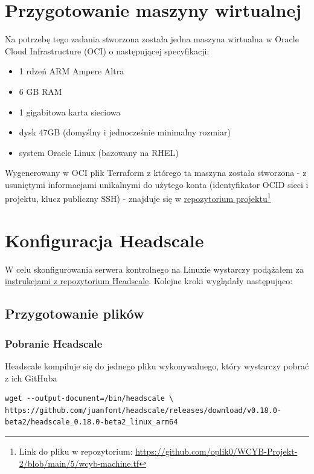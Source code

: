 \documentclass[../main.tex]{subfiles}
\begin{document}
\section{Przygotowanie maszyny wirtualnej}
Na potrzebę tego zadania stworzona została jedna maszyna wirtualna w Oracle Cloud Infrastructure (OCI) o następującej specyfikacji:
\begin{itemize}
    \item 1 rdzeń ARM Ampere Altra
    \item 6 GB RAM
    \item 1 gigabitowa karta sieciowa
    \item dysk 47GB (domyślny i jednocześnie minimalny rozmiar)
    \item system Oracle Linux (bazowany na RHEL)
\end{itemize}
Wygenerowany w OCI plik Terraform z którego ta maszyna została stworzona - z usuniętymi informacjami unikalnymi do użytego konta (identyfikator OCID sieci i projektu, klucz publiczny SSH) - znajduje się w \href{https://github.com/oplik0/WCYB-Projekt-2}{repozytorium projektu}\footnote{Link do pliku w repozytorium: \url{https://github.com/oplik0/WCYB-Projekt-2/blob/main/5/wcyb-machine.tf}}

\section{Konfiguracja Headscale}

W celu skonfigurowania serwera kontrolnego na Linuxie wystarczy podążałem za \href{https://github.com/juanfont/headscale/blob/main/docs/running-headscale-linux.md}{instrukcjami z repozytorium Headscale}. Kolejne kroki wyglądały następująco:

\subsection{Przygotowanie plików}

\subsubsection{Pobranie Headscale}

Headscale kompiluje się do jednego pliku wykonywalnego, który wystarczy pobrać z  ich GitHuba

\begin{verbatim}
wget --output-document=/bin/headscale \
https://github.com/juanfont/headscale/releases/download/v0.18.0-beta2/headscale_0.18.0-beta2_linux_arm64
\end{verbatim}
\end{document}
